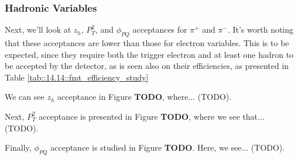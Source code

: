 \subsubsection{Hadronic Variables}
\label{14.22::hadronic_variables}
    Next, we'll look at $z_h$, $P_T^2$, and $\phi_{PQ}$ acceptances for $\pi^+$ and $\pi^-$.
    It's worth noting that these acceptances are lower than those for electron variables.
    This is to be expected, since they require both the trigger electron and at least one hadron to be accepted by the detector, as is seen also on their efficiencies, as presented in Table \ref{tab::14.14::fmt_efficiency_study}

    We can see $z_h$ acceptance in Figure \textbf{TODO}, where... (TODO).

    Next, $P_T^2$ acceptance is presented in Figure \textbf{TODO}, where we see that... (TODO).

    Finally, $\phi_{PQ}$ acceptance is studied in Figure \textbf{TODO}.
    Here, we see... (TODO).
